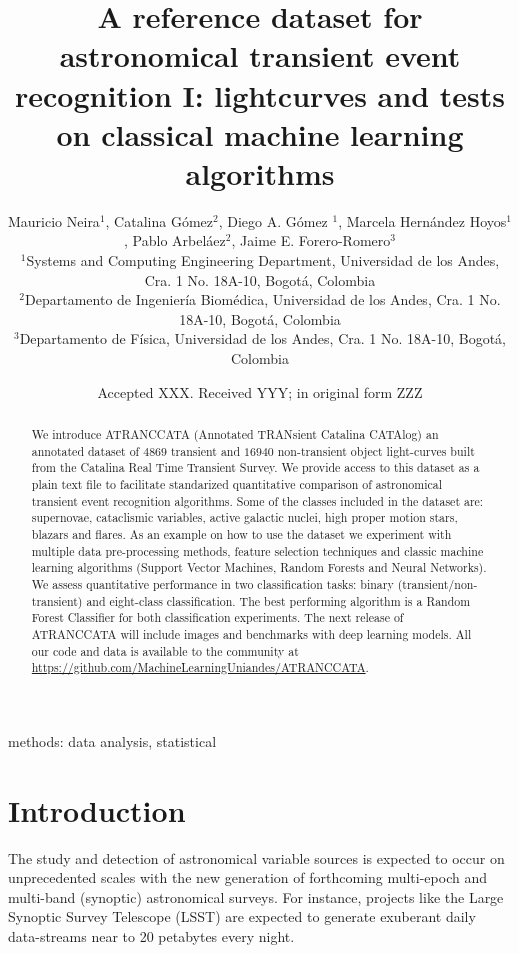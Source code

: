 \documentclass[a4paper,fleqn,usenatbib]{mnras}
\title[A reference transient dataset I: lightcurves]{A reference
  dataset for astronomical transient event recognition I: lightcurves
  and tests on classical machine learning algorithms}
\author[M. Neira et al.]
{Mauricio Neira$^{1}$, Catalina G\'omez$^{2}$, Diego A. G\'omez $^{1}$,
Marcela Hern\'andez Hoyos$^{1}$,   
\newauthor
Pablo Arbel\'aez$^{2}$,
Jaime E. Forero-Romero$^{3}$
\\
$^{1}$Systems and Computing Engineering Department, Universidad de los Andes, Cra. 1 No. 18A-10, Bogot\'a, Colombia\\
$^{2}$Departamento de Ingenier\'ia Biom\'edica, Universidad de los Andes, Cra. 1 No. 18A-10, Bogot\'a, Colombia\\
$^{3}$Departamento de F\'isica, Universidad de los Andes, Cra. 1 No. 18A-10, Bogot\'a, Colombia
}
\date{Accepted XXX. Received YYY; in original form ZZZ}
\begin{document}
\label{firstpage}
\pagerange{\pageref{firstpage}--\pageref{lastpage}}
\maketitle

\begin{abstract}

We introduce ATRANCCATA (Annotated TRANsient Catalina CATAlog) an
annotated dataset of $4869$ transient and $16940$ non-transient
object light-curves built from the Catalina Real Time Transient
Survey.
We provide access to this dataset as a plain text file to facilitate
standarized quantitative comparison of astronomical transient event
recognition algorithms. 
Some of the classes included in the dataset are: supernovae, cataclismic
variables, active galactic nuclei, high proper motion stars, blazars
and flares.
As an example on how to use the dataset we experiment with multiple
data pre-processing methods, feature selection techniques and classic
machine learning algorithms (Support Vector Machines, Random Forests
and Neural Networks).   
We assess quantitative performance in two classification tasks:
binary (transient/non-transient) and eight-class classification.   
The best performing algorithm is a Random Forest Classifier for both
classification experiments.  
The next release of ATRANCCATA will include images and benchmarks with
deep learning models. 
All our code and data is available to the community at
\url{https://github.com/MachineLearningUniandes/ATRANCCATA}.
\end{abstract}

\begin{keywords}
methods: data analysis, statistical
\end{keywords}



\section{Introduction}

The study and detection of astronomical variable sources is expected
to occur on unprecedented scales with the new generation of
forthcoming multi-epoch and multi-band (synoptic) astronomical
surveys. 
For instance, projects like the Large Synoptic Survey Telescope
(LSST)  \citep{0805.2366,1512.07914} are expected to generate
exuberant daily data-streams near to 20 petabytes every night.   
\end{document}
